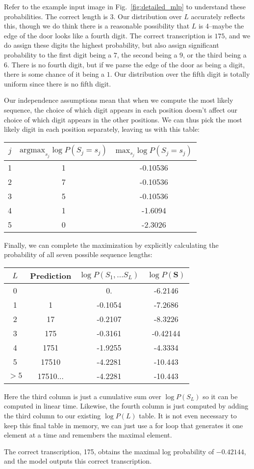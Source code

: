 \documentclass{article} \usepackage{comment}
\begin{document}
Refer to the example input image in Fig.~\ref{fig:detailed_mlp} to understand these probabilities. The correct length is 3.
Our distribution over $L$ accurately reflects this, though we do think there is a reasonable possibility that $L$ is 4--maybe
the edge of the door looks like a fourth digit. The correct transcription is $175$, and we do assign these digits the
highest probability, but also assign significant probability to the first digit being a $7$, the second being a $9$, or the third
being a $6$. There is no fourth digit, but if we parse the edge of the door as being a digit, there is some chance of it being a $1$.
Our distribution over the fifth digit is totally uniform since there is no fifth digit.

Our independence assumptions mean that when we compute the most likely sequence, the choice of which digit appears in each position
doesn't affect our choice of which digit appears in the other positions. We can thus pick the most likely digit in each position
separately, leaving us with this table:

\begin{tabular}{c|c|c}
$j$ & $\text{argmax}_{s_j} \log P(S_j=s_j)$ & $\text{max}_{s_j} \log P(S_j=s_j)$ \\ 
\hline
1 & 1 & -0.10536 \\
\hline
2 & 7 & -0.10536 \\
\hline
3 & 5 & -0.10536 \\
\hline
4 & 1 & -1.6094 \\
\hline
5 & 0 & -2.3026
\end{tabular}

Finally, we can complete the maximization by explicitly calculating the probability of all seven possible sequence lengths:

\begin{tabular}{c|c|c|c}
$L$ & Prediction & $\log P(S_1, \dots S_L)$ & $\log P(\mathbf{S})$ \\
\hline
0 &              & 0.      & -6.2146 \\
\hline
1 & 1            & -0.1054 & -7.2686 \\
\hline
2 & 17           & -0.2107 & -8.3226 \\
\hline
3 & 175          & -0.3161 & -0.42144 \\
\hline
4 & 1751         & -1.9255 & -4.3334 \\
\hline
5 & 17510        & -4.2281 & -10.443 \\
\hline
$>5$&17510$\dots$& -4.2281 & -10.443
\end{tabular}

Here the third column is just a cumulative sum over $\log P(S_L)$ so it can be computed in linear time.
Likewise, the fourth column is just computed by adding the third column to our existing $\log P(L)$ table.
It is not even necessary to keep this final table in memory, we can just use a for loop that generates it
one element at a time and remembers the maximal element.

The correct transcription, 175, obtains the maximal log probability of $-0.42144$, and the model outputs
this correct transcription.
\end{document}
